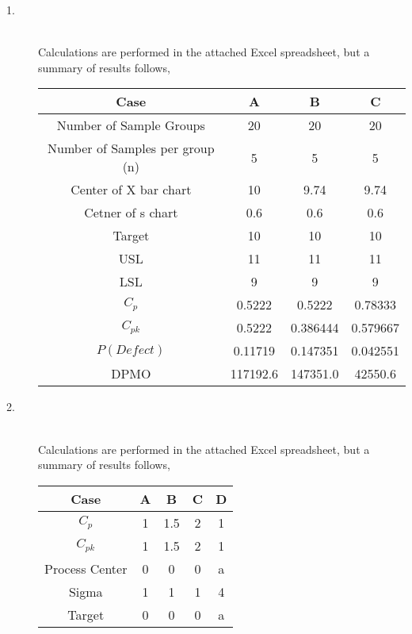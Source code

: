 \documentclass[letterpaper,10pt]{article}
\begin{document}
\begin{description}
\item[1.]\hfill\\
Calculations are performed in the attached Excel spreadsheet, but a summary of results follows,
\begin{center}
\begin{tabular}{|c|c|c|c|}
\hline
Case & A & B & C \\\hline
Number of Sample Groups & 20 & 20 & 20 \\\hline
Number of Samples per group (n) & 5 & 5 & 5\\\hline
Center of X bar chart & 10 & 9.74 & 9.74 \\\hline
Cetner of s chart & 0.6 & 0.6 & 0.6 \\\hline
Target & 10 & 10 & 10 \\\hline
USL & 11 & 11 & 11 \\\hline
LSL & 9 & 9 & 9\\\hline
\cellcolor{yellow!25}$C_p$ & \cellcolor{yellow!25}0.5222 & \cellcolor{yellow!25}0.5222 & \cellcolor{yellow!25}0.78333\\\hline
\cellcolor{yellow!25}$C_{pk}$ & \cellcolor{yellow!25}0.5222 & \cellcolor{yellow!25}0.386444 & \cellcolor{yellow!25}0.579667\\\hline
\cellcolor{yellow!25}$P(Defect)$ & \cellcolor{yellow!25}0.11719 & \cellcolor{yellow!25}0.147351 & \cellcolor{yellow!25}0.042551\\\hline
\cellcolor{yellow!25}DPMO & \cellcolor{yellow!25}117192.6 & \cellcolor{yellow!25}147351.0 & \cellcolor{yellow!25}42550.6\\\hline
\end{tabular}
\end{center}
\item[2.]\hfill \\
Calculations are performed in the attached Excel spreadsheet, but a summary of results follows,
\begin{center}
\begin{tabular}{|c|c|c|c|c|}
\hline
Case & A & B & C & D \\\hline
$C_p$ & 1 & 1.5 & 2 & \cellcolor{yellow!25}1\\\hline
$C_{pk}$ & 1 & 1.5 & 2 & \cellcolor{yellow!25}1\\\hline
Process Center & 0 & 0 & 0 & a\\\hline
Sigma & 1 & 1 & 1 & 4\\\hline
Target & 0 & 0 & 0 & a\\\hline

\end{tabular}
\end{center}
\end{description}
\end{document}
